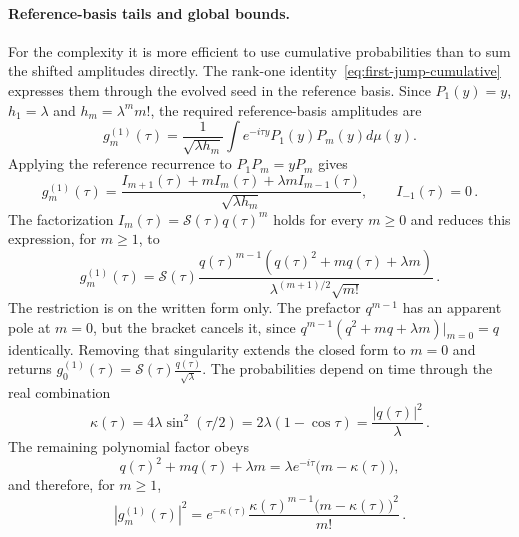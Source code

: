 \documentclass[a4paper,11pt]{article}
\def\dd{d}%
\def\ii{i}%
\def\ee{e}%
\theoremstyle{definition}
\theoremstyle{remark}
\newcommand{\dd}{\mathrm d}
\newcommand{\ii}{\mathrm i}
\newcommand{\ee}{\mathrm e}
\newcommand{\cS}{\mathcal S}
\begin{document}
\paragraph{Reference-basis tails and global bounds.}
For the complexity it is more efficient to use cumulative probabilities than to sum the shifted amplitudes directly. The rank-one identity~\eqref{eq:first-jump-cumulative} expresses them through the evolved seed in the reference basis. Since \(P_1(y)=y\), \(h_1=\lambda\) and \(h_m=\lambda^m m!\), the required reference-basis amplitudes are
\begin{equation}
   g_m^{(1)}(\tau)
   =
   \frac{1}{\sqrt{\lambda h_m}}
   \int \ee^{-\ii \tau y}P_1(y)P_m(y)\dd\mu(y).
   \label{eq:H1-gm-first-jump-app}
\end{equation}
Applying the reference recurrence to $P_1P_m=yP_m$ gives
\begin{equation}
   g_m^{(1)}(\tau)
   =
   \frac{I_{m+1}(\tau)+mI_m(\tau)+\lambda m I_{m-1}(\tau)}
        {\sqrt{\lambda h_m}},
   \qquad I_{-1}(\tau)=0\,.
   \label{eq:H1-gm-reference-moments-app}
\end{equation}
The factorization \(I_m(\tau)=\cS(\tau)q(\tau)^m\) holds for every $m\ge0$ and reduces this expression, for $m\ge1$, to
\begin{equation}
   g_m^{(1)}(\tau)
   =
   \cS(\tau)
   \frac{q(\tau)^{m-1}
   \left(q(\tau)^2+mq(\tau)+\lambda m\right)}
   {\lambda^{(m+1)/2}\sqrt{m!}}\,.
   \label{eq:H1-gm-closed-app}
\end{equation}
The restriction is on the written form only. The prefactor $q^{m-1}$ has an apparent pole at $m=0$, but the bracket cancels it, since $q^{m-1}(q^2+mq+\lambda m)\big|_{m=0}=q$ identically. Removing that singularity extends the closed form to $m=0$ and returns 
$
   g_0^{(1)}(\tau)=\cS(\tau)\frac{q(\tau)}{\sqrt{\lambda}}.
$
The probabilities depend on time through the real combination
\begin{equation}
   \kappa(\tau)=4\lambda\sin^2(\tau/2)
   =2\lambda(1-\cos\tau)
   =\frac{|q(\tau)|^2}{\lambda}\,.
\end{equation}
The remaining polynomial factor obeys
\begin{equation}
   q(\tau)^2+mq(\tau)+\lambda m
   =
   \lambda\ee^{-\ii\tau}\bigl(m-\kappa(\tau)\bigr),
\end{equation}
and therefore, for $m\ge1$,
\begin{equation}
   |g_m^{(1)}(\tau)|^2
   =
   \ee^{-\kappa(\tau)}
   \frac{\kappa(\tau)^{m-1}\bigl(m-\kappa(\tau)\bigr)^2}{m!}\,.
   \label{eq:H1-reference-basis-probability-app}
\end{equation}
\end{document}
